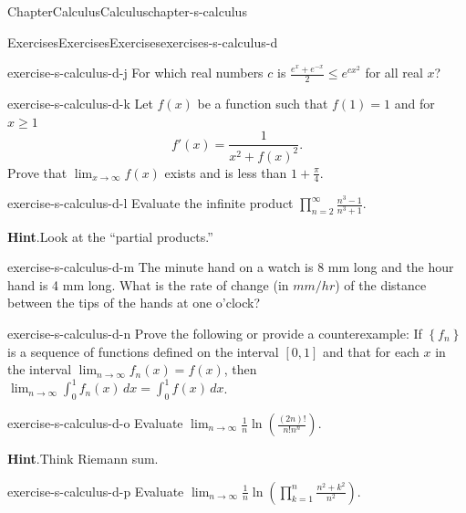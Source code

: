 \documentclass[oneside,10pt,]{book}
\newcommand{\blocktitlefont}{\relax}
\numberwithin{equation}{section}
\begin{document}
\begin{chapterptx}{Chapter}{Calculus}{}{Calculus}{}{}{chapter-s-calculus}
\begin{exercises-section}{Exercises}{Exercises}{}{Exercises}{}{}{exercises-s-calculus-d}
\begin{divisionexercise}{9}{}{}{exercise-s-calculus-d-j}
For which real numbers \(c\) is \(\frac{e^x+ e^{-x}}{2}\leq e^{c x^2}\) for all real \(x\)?%
\end{divisionexercise}%
\begin{divisionexercise}{10}{}{}{exercise-s-calculus-d-k}%
Let \(f(x)\) be a function such that \(f(1)=1\) and for \(x\geq 1\)%
\begin{equation*}
f'(x)=\frac{1}{x^2+ f(x)^2}\text{.}
\end{equation*}
Prove that \(\lim_{x\to \infty } f(x)\) exists and is less than \(1+\frac{\pi}{4}\).%
\end{divisionexercise}%
\begin{divisionexercise}{11}{}{}{exercise-s-calculus-d-l}%
Evaluate the infinite product \(\prod _{n=2}^{\infty } \frac{n^3-1}{n^3+1}\).%
\par\smallskip%
\noindent\textbf{\blocktitlefont Hint}.\hypertarget{hint-s-calculus-d-l-b}{}\quad{}Look at the ``partial products.''%
\end{divisionexercise}%
\begin{divisionexercise}{12}{}{}{exercise-s-calculus-d-m}%
The minute hand on a watch is 8 mm long and the hour hand is 4 mm long. What is the rate of change (in \(mm/hr\)) of  the distance between the tips of the hands at one o’clock?%
\end{divisionexercise}%
\begin{divisionexercise}{13}{}{}{exercise-s-calculus-d-n}%
Prove the following or provide a counterexample:  If \(\left\{f_n\right\}\) is a sequence of functions defined on the interval \([0,1]\) and that for each \(x\) in the interval \(\lim_{n\to \infty } f_n(x) = f(x)\),  then    \(\lim_{n\to \infty } \int_0^1 f_n(x) \, dx=\int_0^1 f(x)
\, dx\).%
\end{divisionexercise}%
\begin{divisionexercise}{14}{}{}{exercise-s-calculus-d-o}%
Evaluate \(\lim_{n \rightarrow \infty} \frac{1}{n}\ln{\left(\frac{(2n)!}{n! n^n}\right)}\).%
\par\smallskip%
\noindent\textbf{\blocktitlefont Hint}.\hypertarget{hint-s-calculus-d-o-b}{}\quad{}Think Riemann sum.%
\end{divisionexercise}%
\begin{divisionexercise}{15}{}{}{exercise-s-calculus-d-p}%
Evaluate \(\lim_{n \rightarrow \infty} \frac{1}{n}\ln \left(\prod_{k=1}^{n} \frac{ n^2+k^2}{n^2}\right)\).%
\end{divisionexercise}%
\end{exercises-section}
\end{chapterptx}
\end{document}
